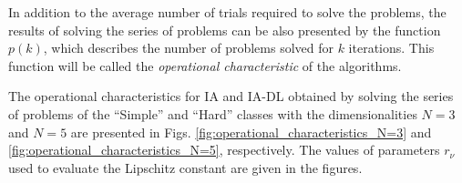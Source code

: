 \documentclass[twocolumn]{svjour3}          %
\begin{document}
	In addition to the average number of trials required to solve the problems, the results of solving the series of problems can be also presented by the function $p(k)$, which describes the number of problems solved for $k$ iterations. This function will be called the \textit{operational characteristic} of the algorithms.
	
	The operational characteristics for IA and IA-DL obtained by solving the series of problems of the “Simple” and “Hard” classes with the dimensionalities $N=3$ and $N=5$ are presented in Figs. \ref{fig:operational_characteristics_N=3} and \ref{fig:operational_characteristics_N=5}, respectively. The values of parameters $r_{\nu}$ used to evaluate the Lipschitz constant are given in the figures.

\begin{figure}[h!]
	\begin{minipage}[h]{0.48\linewidth}
	\end{minipage}
	\hfill
	\begin{minipage}[h]{0.48\linewidth}

\end{minipage}
\end{figure}
\end{document}
